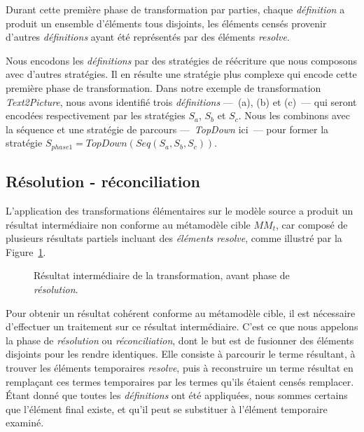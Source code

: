 %    

Durant cette première phase de transformation par parties, chaque
\emph{définition} a produit un ensemble d'éléments tous disjoints, les éléments
censés provenir d'autres \emph{définitions} ayant été représentés par des
éléments \emph{resolve}. %

Nous encodons les \emph{définitions} par des stratégies de réécriture que nous
composons avec d'autres stratégies. Il en résulte une stratégie plus complexe
qui encode cette première phase de transformation.  Dans notre exemple de
transformation \emph{Text2Picture}, nous avons identifié trois
\emph{définitions} ---~(a), (b) et (c)~--- qui seront encodées respectivement
par les stratégies $S_a$, $S_b$ et $S_c$. Nous les combinons avec la séquence
et une stratégie de parcours ---~\emph{TopDown} ici~--- pour former la
stratégie $S_{phase1} = TopDown(Seq(S_a,S_b,S_c))$.




\subsection{Résolution - réconciliation}
\label{approach:subsec:reconciliation}

L'application des transformations élémentaires sur le modèle source a produit
un résultat intermédiaire non conforme au métamodèle cible $MM_t$, car composé
de plusieurs résultats partiels incluant des \emph{éléments resolve}, comme
illustré par la Figure~\ref{fig:approachIntermediateResult}.

\begin{figure}[h]
  \begin{center}
   
   \caption{Résultat intermédiaire de la transformation, avant phase de \emph{résolution}.}
    \label{fig:approachIntermediateResult}
  \end{center}
\end{figure}


Pour obtenir un résultat cohérent conforme au métamodèle cible, il est
nécessaire d'effectuer un traitement sur ce résultat intermédiaire. C'est ce
que nous appelons la phase de \emph{résolution} ou \emph{réconciliation}, dont
le but est de fusionner des éléments disjoints pour les rendre identiques. Elle
consiste à parcourir le terme résultant, à trouver les éléments temporaires
\emph{resolve}, puis à reconstruire un terme résultat en remplaçant ces termes
temporaires par les termes qu'ils étaient censés remplacer. Étant donné que
toutes les \emph{définitions} ont été appliquées, nous sommes certains que
l'élément final existe, et qu'il peut se substituer à l'élément temporaire
examiné.

